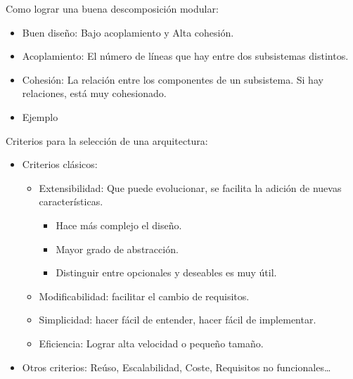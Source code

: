 \documentclass[12pt, twoside, openright]{report} %
\begin{document}
Como lograr una buena descomposición modular:

\begin{itemize}
	\item Buen diseño: Bajo acoplamiento y Alta cohesión.
	\item Acoplamiento: El número de líneas que hay entre dos subsistemas
		distintos.
	\item Cohesión: La relación entre los componentes de un subsistema. Si
		hay relaciones, está muy cohesionado.
	\item Ejemplo
	\begin{figure}[H]
		{\def\svgwidth{.8\textwidth}
  		 }
	\end{figure}

\end{itemize}
\pagebreak

Criterios para la selección de una arquitectura:

\begin{itemize}
	\item Criterios clásicos:
		\begin{itemize}
			\item Extensibilidad: Que puede evolucionar, se facilita la adición de
			nuevas características.
				\begin{itemize}
					\item Hace más complejo el diseño.
					\item Mayor grado de abstracción.
					\item Distinguir entre opcionales y deseables es muy útil.
				\end{itemize}
			\item Modificabilidad: facilitar el cambio de requisitos.
			\item Simplicidad: hacer fácil de entender, hacer fácil de
			implementar.
			\item Eficiencia: Lograr alta velocidad o pequeño tamaño.
		\end{itemize}
	\item Otros criterios: Reúso, Escalabilidad, Coste, Requisitos no
		funcionales\ldots{}
\end{itemize}
\end{document}
